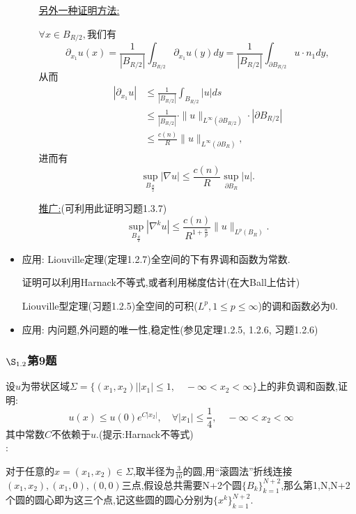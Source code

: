 \documentclass[12pt, a4paper]{ctexart}
\begin{document}
\begin{itemize}
\begin{enumerate}
            \uline{另外一种证明方法:}
            
            $\forall x\in B_{R/2},$我们有
            $$ \partial_{x_1}u(x) = \frac1{|B_{R/2}|}\int_{B_{R/2}}\partial_{x_1}u(y)dy = \frac1{|B_{R/2}|}\int_{\partial B_{R/2}} u \cdot n_1dy ,$$
            从而
            \begin{align*}
            |\partial_{x_1}u| &\leq \frac1{|B_{R/2}|}\int_{B_{R/2}}|u|ds \\
            &\leq \frac1{|B_{R/2}|} \cdot \|u\|_{L^\infty(\partial B_{R/2})}\cdot |\partial B_{R/2}|\\
            &\leq \frac{c(n)}{R} \|u\|_{L^\infty(\partial B_{R})},
            \end{align*}
            进而有$$
            \sup_{B_{\frac{R}{2}}} |\nabla u| \le \frac{c(n)}{R} \sup_{\partial B_R}|u|.$$
            
            \uline{推广:}(可利用此证明习题1.3.7)
            $$
            \sup_{B_{\frac{R}{2}}} |\nabla^k u| \le \frac{c(n)}{R^{1+\frac np}} \|u\|_{L^p(B_R)}.$$
            
            
        \end{enumerate}
        \item 应用: Liouville定理(定理1.2.7)全空间的下有界调和函数为常数.
        
        证明可以利用Harnack不等式,或者利用梯度估计(在大Ball上估计)
        
        \noindent Liouville型定理(习题1.2.5)全空间的可积($L^p, 1\leq p\leq\infty$)的调和函数必为0.
        
        \item 应用: 内问题,外问题的唯一性,稳定性(参见定理1.2.5, 1.2.6, 习题1.2.6)
        
    \end{itemize}
    
    
    
    
    \subsubsection{$\S_{1.2}$第9题}
	\kaishu{}
	设$u$为带状区域$\Sigma=\{(x_1,x_2)||x_1|\le 1, \quad -\infty<x_2< \infty\}$上的非负调和函数,证明:$$
	u(x)\le u(0)e^{C|x_2|},\quad \forall |x_1|\le \frac{1}{4},\quad -\infty<x_2< \infty		$$
	其中常数$C$不依赖于$u$.(提示:Harnack不等式)\\
	
	\songti{}
	:
	
	对于任意的$x=(x_1,x_2)\in \Sigma$,取半径为$\frac{3}{16}$的圆,用“滚圆法”折线连接$(x_1,x_2),(x_1,0),(0,0)$三点,假设总共需要N+2个圆$\{B_k\}_{k=1}^{N+2}$,那么第1,N,N+2个圆的圆心即为这三个点,记这些圆的圆心分别为$\{x^k\}_{k=1}^{N+2}$.
	
\end{document}

